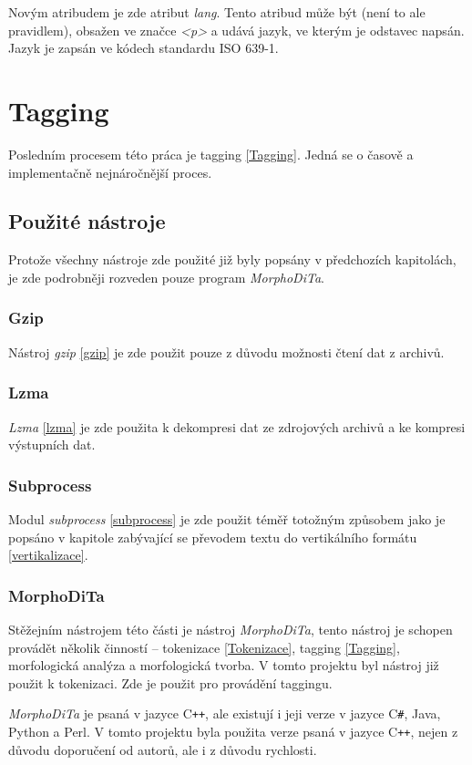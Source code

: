 Novým atribudem je zde atribut \textit{lang}. Tento atribud může být (není to ale pravidlem), obsažen ve značce
\textit{<p>} a udává jazyk, ve kterým je odstavec napsán. Jazyk je zapsán ve kódech standardu ISO 639-1.

\chapter{Tagging}
\label{morphodita}
Posledním procesem této práca je tagging \ref{Tagging}. Jedná se o časově a implementačně
nejnáročnější proces.

\section{Použité nástroje}
Protože všechny nástroje zde použité již byly popsány v předchozích kapitolách, je zde podrobněji
rozveden pouze program \textit{MorphoDiTa}.

\subsection{Gzip}
Nástroj \textit{gzip} \ref{gzip} je zde použit pouze z důvodu možnosti čtení dat z archivů.

\subsection{Lzma}
\textit{Lzma} \ref{lzma} je zde použita k dekompresi dat ze zdrojových archivů a ke kompresi výstupních dat.

\subsection{Subprocess}
Modul \textit{subprocess} \ref{subprocess} je zde použit téměř totožným způsobem jako je popsáno v kapitole zabývající
se převodem textu do vertikálního formátu \ref{vertikalizace}.

\subsection{MorphoDiTa}
\label{morphodita}
Stěžejním nástrojem této části je nástroj \textit{MorphoDiTa}, tento nástroj je schopen provádět
několik činností -- tokenizace \ref{Tokenizace}, tagging \ref{Tagging}, morfologická analýza a morfologická tvorba. V tomto projektu
byl nástroj již použit k tokenizaci. Zde je použit pro provádění taggingu.

\textit{MorphoDiTa} je psaná v jazyce C\texttt{++}, ale existují i jeji verze v jazyce C\texttt{\#}, Java,
Python a Perl. V tomto projektu byla použita verze psaná v jazyce C\texttt{++}, nejen z důvodu doporučení od autorů, ale
i z důvodu rychlosti.


